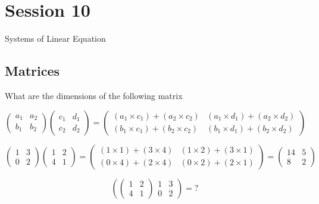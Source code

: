 \documentclass[]{report}
\begin{document}
{{{{{{\chapter{Session 10 }
Systems of Linear Equation
\section{Matrices}

What are the dimensions of the following matrix


\[ \left(
\begin{array}{cc}
a_1 & a_2 \\ 
b_1 & b_2
\end{array} \right)\left(
\begin{array}{cc}
c_1 & d_1 \\ 
c_2 & d_2
\end{array} \right) = \left(
\begin{array}{cc}
(a_1 \times c_1) + (a_2 \times c_2) & (a_1 \times d_1) + (a_2 \times d_2) \\ 
(b_1 \times c_1) + (b_2 \times c_2) & (b_1 \times d_1) + (b_2 \times d_2)
\end{array} \right) \]

\bigskip
\large{
\[ \left(
\begin{array}{cc}
1 & 3 \\ 
0 & 2
\end{array} \right)\left(
\begin{array}{cc}
1 & 2 \\ 
4 & 1
\end{array} \right) = \left(
\begin{array}{cc}
(1 \times 1) + (3 \times 4) & (1 \times 2) + (3 \times 1) \\ 
(0 \times 4) + (2 \times 4) & (0 \times 2) + (2 \times 1)
\end{array} \right) = \left(
\begin{array}{cc}
14 & 5 \\ 
8 & 2
\end{array} \right) \]
}

\[ \left(
\left(
\begin{array}{cc}
1 & 2 \\ 
4 & 1
\end{array} \right)
\begin{array}{cc}
1 & 3 \\ 
0 & 2
\end{array} \right) = ? \]



}}}}}}
\end{document}
